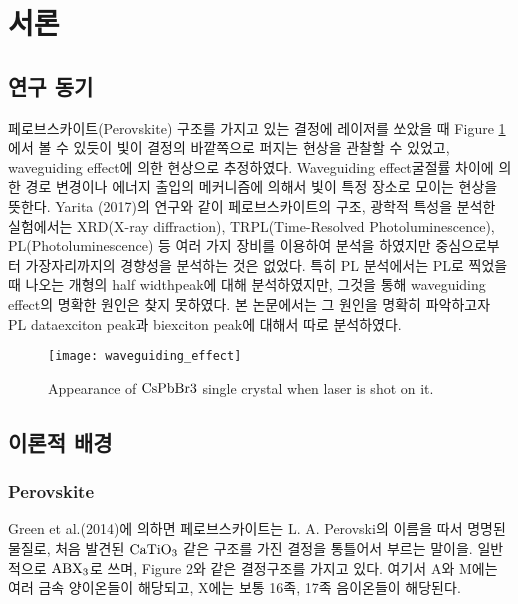
\section{서론}
\subsection{연구 동기}

페로브스카이트(Perovskite) 구조를 가지고 있는 결정에 레이저를 쏘았을 때 Figure \ref{fig:waveguide} 에서 볼 수 있듯이 빛이 결정의 바깥쪽으로 퍼지는 현상을 관찰할 수 있었고, waveguiding effect에 의한 현상으로 추정하였다. Waveguiding effect\는 굴절률 차이에 의한 경로 변경이나 에너지 출입의 메커니즘에 의해서 빛이 특정 장소로 모이는 현상을 뜻한다. Yarita (2017)의 연구와 같이 페로브스카이트의 구조, 광학적 특성을 분석한 실험에서는 XRD(X-ray diffraction), TRPL(Time-Resolved Photoluminescence), PL(Photoluminescence) 등 여러 가지 장비를 이용하여 분석을 하였지만 중심으로부터 가장자리까지의 경향성을 분석하는 것은 없었다\cite{yarita2017dynamics}. 특히 PL 분석에서는 PL로 찍었을 때 나오는 개형의 half width\과 peak에 대해 분석하였지만, 그것을 통해 waveguiding effect의 명확한 원인은 찾지 못하였다. 본 논문에서는 그 원인을 명확히 파악하고자 PL data\를 exciton peak과 biexciton peak에 대해서 따로 분석하였다. 

\begin{figure}[H]
	\begin{center}
			\texttt{[image: waveguiding\_effect]}
	\end{center}
	\caption{Appearance of $\rm CsPbBr3$ single crystal when laser is shot on it.}
	\label{fig:waveguide}  
\end{figure}

\subsection{이론적 배경}

\subsubsection{Perovskite}
Green et al.(2014)에 의하면 페로브스카이트는 L. A. Perovski의 이름을 따서 명명된 물질로, 처음 발견된 $\rm CaTiO_3$  같은 구조를 가진 결정을 통틀어서 부르는 말이을\cite{green2014emergence}. 일반적으로 $\rm ABX_3$로 쓰며, Figure 2와 같은 결정구조를 가지고 있다. 여기서 A와 M에는 여러 금속 양이온들이 해당되고, X에는 보통 16족, 17족 음이온들이 해당된다.



